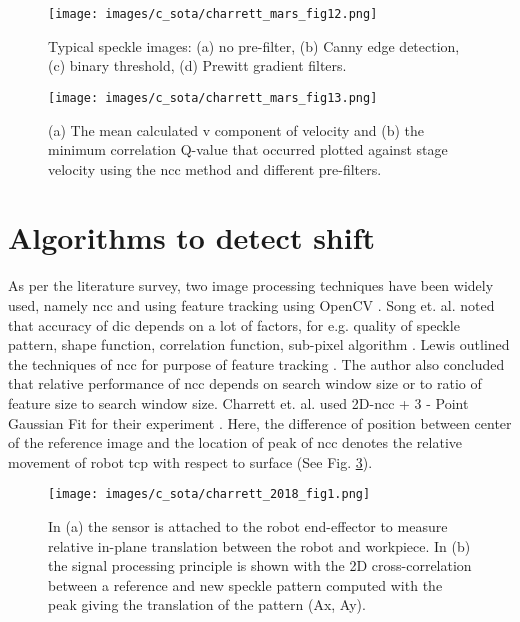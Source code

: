 \begin{figure}[h] 
    \centering
    \texttt{[image: images/c\_sota/charrett\_mars\_fig12.png]}
    \caption{Typical speckle images: (a) no pre-filter, (b) Canny edge detection, (c) binary threshold, (d) Prewitt gradient filters. \cite{charrett_mars}}
    \label{fig:charrett_mars_fig12}
\end{figure}

\begin{figure}[h]
    \centering
    \texttt{[image: images/c\_sota/charrett\_mars\_fig13.png]}
    \caption{(a) The mean calculated v component of velocity and (b) the minimum correlation Q-value that occurred plotted against stage velocity using the \gls{ncc} method and different pre-filters. \cite{charrett_mars}}
    \label{fig:charrett_mars_fig13}
\end{figure}

\clearpage

\section{Algorithms to detect shift}\label{Section:Algorithms}

As per the literature survey, two image processing techniques have been widely used, namely \Gls{ncc} and using feature tracking using OpenCV \cite{opencv}. Song et. al. noted that accuracy of \gls{dic} depends on a lot of factors, for e.g. quality of speckle pattern, shape function, correlation function, sub-pixel algorithm \cite{song}. Lewis outlined the techniques of \gls{ncc} for purpose of feature tracking \cite{lewis}. The author also concluded that relative performance of \gls{ncc} depends on search window size or to ratio of feature size to search window size. Charrett et. al. used 2D-\gls{ncc} + 3 - Point Gaussian Fit for their experiment \cite{charrett_2018}. Here, the difference of position between center of the reference image and the location of peak of \gls{ncc} denotes the relative movement of robot \gls{tcp} with respect to surface (See Fig. \ref{fig:charrett_2018_fig1}).  

\begin{figure}[h]
    \centering
    \texttt{[image: images/c\_sota/charrett\_2018\_fig1.png]}
    \caption{In (a) the sensor is attached to the robot end-effector to measure relative in-plane translation between the robot and workpiece. In (b) the signal processing principle is shown with the 2D cross-correlation between a reference and new speckle pattern computed with the peak giving the translation of the pattern (Ax, Ay). \cite{charrett_2018}}
    \label{fig:charrett_2018_fig1}
\end{figure} 

